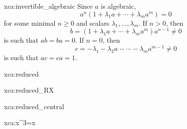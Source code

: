 
\begin{sol}{xca:invertible_algebraic}
	Since $a$ is algebraic, 
	\[
		a^n(1+\lambda_1a+\cdots+\lambda_ma^m)=0
	\]
	for some minimal $n\geq0$ and scalars $\lambda_1,\dots,\lambda_m$. If  
	$n>0$, then 
	\[
	b=(1+\lambda_1a+\cdots+\lambda_ma^m)a^{n-1}\ne 0
	\]
	is such that $ab=ba=0$. If $n=0$, then  
	\[
		c=-\lambda_1-\lambda_2a-\cdots-\lambda_ma^{m-1}\ne 0
	\]
	is such that $ac=ca=1$. 
\end{sol}

\begin{sol}{xca:reduced}

\end{sol}

\begin{sol}{xca:reduced_RX}

\end{sol}

\begin{sol}{xca:reduced_central}
\end{sol}

\begin{sol}{xca:x^3=x}
\end{sol}

